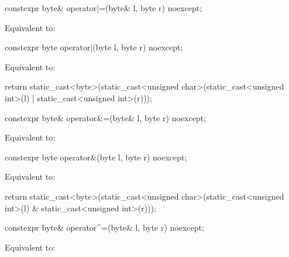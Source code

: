 %
\begin{itemdecl}
constexpr byte& operator|=(byte& l, byte r) noexcept;
\end{itemdecl}

\begin{itemdescr}
\pnum
\effects
Equivalent to: 
\end{itemdescr}

%
\begin{itemdecl}
constexpr byte operator|(byte l, byte r) noexcept;
\end{itemdecl}

\begin{itemdescr}
\pnum
\effects
Equivalent to:
\begin{codeblock}
return static_cast<byte>(static_cast<unsigned char>(static_cast<unsigned int>(l) |
                                                    static_cast<unsigned int>(r)));
\end{codeblock}
\end{itemdescr}

%
\begin{itemdecl}
constexpr byte& operator&=(byte& l, byte r) noexcept;
\end{itemdecl}

\begin{itemdescr}
\pnum
\effects
Equivalent to: 
\end{itemdescr}

%
\begin{itemdecl}
constexpr byte operator&(byte l, byte r) noexcept;
\end{itemdecl}

\begin{itemdescr}
\pnum
\effects
Equivalent to:
\begin{codeblock}
return static_cast<byte>(static_cast<unsigned char>(static_cast<unsigned int>(l) &
                                                    static_cast<unsigned int>(r)));
\end{codeblock}
\end{itemdescr}

%
\begin{itemdecl}
constexpr byte& operator^=(byte& l, byte r) noexcept;
\end{itemdecl}

\begin{itemdescr}
\pnum
\effects
Equivalent to: 
\end{itemdescr}

